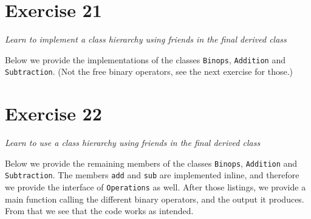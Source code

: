 \documentclass[12pt]{article}
\newcommand{\desc}[1]{\textit{#1} \vspace{1em}}
\begin{document}




\clearpage

\section*{Exercise 21}
\desc{Learn to implement a class hierarchy using friends in the final derived class}

Below we provide the implementations of the classes \texttt{Binops}, \texttt{Addition} and \texttt{Subtraction}. (Not the free binary operators, see the next exercise for those.)












\clearpage

\section*{Exercise 22}
\desc{Learn to use a class hierarchy using friends in the final derived class}

Below we provide the remaining members of the classes \texttt{Binops}, \texttt{Addition} and \texttt{Subtraction}. The members \texttt{add} and \texttt{sub} are implemented inline, and therefore we provide the interface of \texttt{Operations} as well. After those listings, we provide a main function calling the different binary operators, and the output it produces. From that we see that the code works as intended. 






\end{document}
